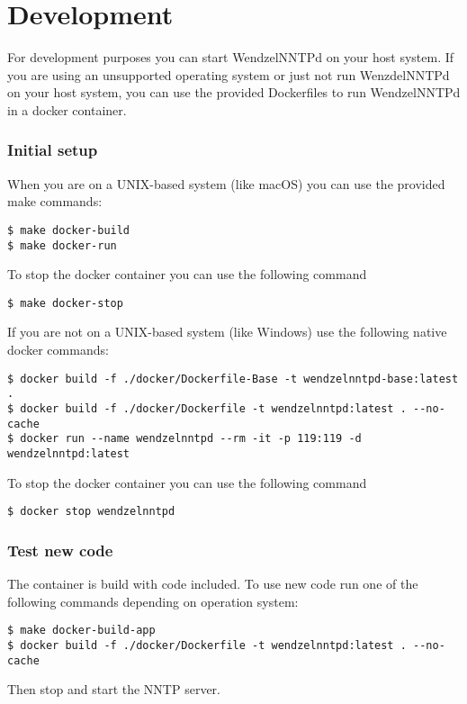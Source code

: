 \chapter{Development}

For development purposes you can start WendzelNNTPd on your host system. If you are using an unsupported operating system or just not run WenzdelNNTPd on your host system, you can use the provided Dockerfiles to run WendzelNNTPd in a docker container.

\subsection{Initial setup}
When you are on a UNIX-based system (like macOS) you can use the provided make commands:
\begin{verbatim}
$ make docker-build
$ make docker-run
\end{verbatim}
To stop the docker container you can use the following command
\begin{verbatim}
$ make docker-stop
\end{verbatim}
If you are not on a UNIX-based system (like Windows) use the following native docker commands:
\begin{verbatim}
$ docker build -f ./docker/Dockerfile-Base -t wendzelnntpd-base:latest .
$ docker build -f ./docker/Dockerfile -t wendzelnntpd:latest . --no-cache
$ docker run --name wendzelnntpd --rm -it -p 119:119 -d wendzelnntpd:latest
\end{verbatim}
To stop the docker container you can use the following command
\begin{verbatim}
$ docker stop wendzelnntpd
\end{verbatim}

\subsection{Test new code}
The container is build with code included. To use new code run one of the following commands depending on operation system:
\begin{verbatim}
$ make docker-build-app
$ docker build -f ./docker/Dockerfile -t wendzelnntpd:latest . --no-cache
\end{verbatim}
Then stop and start the NNTP server.